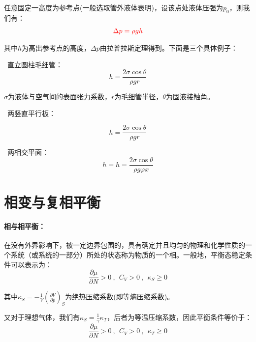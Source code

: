 \documentclass[zihao=-4,UTF8]{report}
\begin{document}
任意固定一高度为参考点(一般选取管外液体表明)，设该点处液体压强为$p_0$，则我们有：
\begin{equation}
    {\color{red}\Delta p = \rho g h}
\end{equation}
{\par\color{gray}\small
其中$h$为高出参考点的高度，$\Delta p$由拉普拉斯定理得到。下面是三个具体例子：
\par}

{\par\color{gray}\small
\par{}\  直立圆柱毛细管：
\begin{equation*}
    h = \frac{2\sigma \cos\theta}{\rho gr}
\end{equation*}  
{\par\color{gray}\small
$\sigma$为液体与空气间的表面张力系数，$r$为毛细管半径，$\theta$为固液接触角。
\par}\par
{}\   两竖直平行板：  \par
{\par\color{gray}\small
\begin{equation*}
    h = \frac{2\sigma \cos\theta}{\rho gr}
\end{equation*}
\par}
\  两相交平面：
\begin{equation*}
    h= h = \frac{2\sigma \cos\theta}{\rho g \varphi x}
\end{equation*}   \par
\par}


\chapter{相变与复相平衡}
\subsubsection{相与相平衡：}
在没有外界影响下，被一定边界包围的，具有确定并且均匀的物理和化学性质的一个系统（或系统的一部分）所处的状态称为物质的一个相。一般地，平衡态稳定条件可以表示为：
\begin{equation}
    \frac{\partial \mu }{\partial N } >0\ ,\ \ C_V >0\ ,\ \ \kappa_S \ge 0
\end{equation}
{\par\color{gray}\small
其中$\kappa_S = - \frac{1}{V}\left(\frac{\partial V}{\partial p }\right)_{S}$为绝热压缩系数(即等熵压缩系数)。
\par}
又对于理想气体，我们有$\kappa_S = \frac{1}{\gamma}\kappa_T$，后者为等温压缩系数，因此平衡条件等价于：
\begin{equation}
    \frac{\partial \mu }{\partial N } >0\ ,\ \ C_V >0\ ,\ \ \kappa_T \ge 0
\end{equation}
\end{document}
